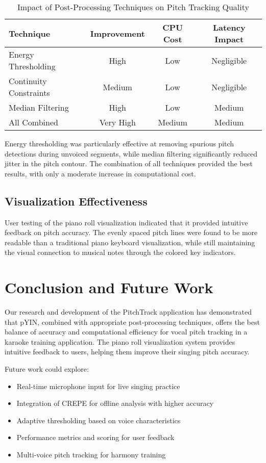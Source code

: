 \documentclass[conference]{IEEEtran}
\begin{document}
\begin{table}[htbp]
\caption{Impact of Post-Processing Techniques on Pitch Tracking Quality}
\begin{center}
\begin{tabular}{|l|c|c|c|}
\hline
\textbf{Technique} & \textbf{Improvement} & \textbf{CPU Cost} & \textbf{Latency Impact} \\
\hline
Energy Thresholding & High & Low & Negligible \\
\hline
Continuity Constraints & Medium & Low & Negligible \\
\hline
Median Filtering & High & Low & Medium \\
\hline
All Combined & Very High & Medium & Medium \\
\hline
\end{tabular}
\label{tab:post_processing}
\end{center}
\end{table}

Energy thresholding was particularly effective at removing spurious pitch detections during unvoiced segments, while median filtering significantly reduced jitter in the pitch contour. The combination of all techniques provided the best results, with only a moderate increase in computational cost.

\subsection{Visualization Effectiveness}
User testing of the piano roll visualization indicated that it provided intuitive feedback on pitch accuracy. The evenly spaced pitch lines were found to be more readable than a traditional piano keyboard visualization, while still maintaining the visual connection to musical notes through the colored key indicators.

\section{Conclusion and Future Work}
Our research and development of the PitchTrack application has demonstrated that pYIN, combined with appropriate post-processing techniques, offers the best balance of accuracy and computational efficiency for vocal pitch tracking in a karaoke training application. The piano roll visualization system provides intuitive feedback to users, helping them improve their singing pitch accuracy.

Future work could explore:
\begin{itemize}
    \item Real-time microphone input for live singing practice
    \item Integration of CREPE for offline analysis with higher accuracy
    \item Adaptive thresholding based on voice characteristics
    \item Performance metrics and scoring for user feedback
    \item Multi-voice pitch tracking for harmony training
\end{itemize}
\end{document}

